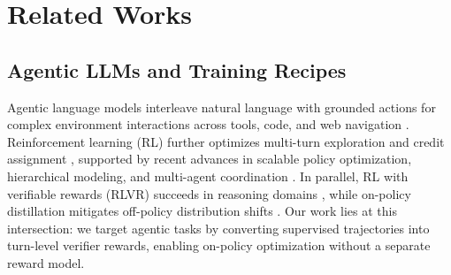 \section{Related Works}
\label{sec:related}

\subsection{Agentic LLMs and Training Recipes}
Agentic language models interleave natural language with grounded actions for complex environment interactions across tools, code, and web navigation \citep{yao2023react,schick2023toolformer,xu2023toolbench,qin2023toolllm,shridhar2020alfworld,wang2022scienceworld,jimenez2024swebench,wang2025openhandsopenplatformai,pan2025trainingsoftwareengineeringagents,yao2022webshop,wei2025browsecompsimplechallengingbenchmark,ma2024agentboard,wang2024sotopiapi}. 
Reinforcement learning (RL) further optimizes multi-turn exploration and credit assignment \citep{ouyang2022training,schulman2017ppo,schulman2015trpo,wang2025sparl,song2024trialerror,zhang2025rlvmr}, supported by recent advances in scalable policy optimization, hierarchical modeling, and multi-agent coordination \citep{ji2025treesearchllmrl,rohatgi2025tamingprocessverifiers,xue2025simpletir,dong2025toolstar,yang2025dcpo,yu2025dapoopensourcellmreinforcement,luo2025agentlightningtrainai,dong2025agenticreinforcedpolicyoptimization,su2025toolorchestra,zhou2024archer,prabhakar2025apigenmtagenticpipelinemultiturn,zhou2025sweetrl,xi2025agentgymrl}. 
In parallel, RL with verifiable rewards (RLVR) succeeds in reasoning domains \citep{shao2024deepseekmath,xin2024deepseekproverv15harnessingproofassistant,Guo_2025,5team2025glm45agenticreasoningcoding}, while on-policy distillation mitigates off-policy distribution shifts \citep{lu2025onpolicydistillation,zhao2026selfdistilledreasoneronpolicyselfdistillation,xu2025learninginteractionagenticdistillation,hubotter2026selfdistillation}. 
Our work lies at this intersection: we target agentic tasks by converting supervised trajectories into turn-level verifier rewards, enabling on-policy optimization without a separate reward model.

